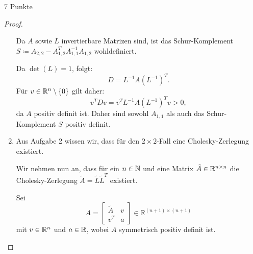 \documentclass{problemset}
\begin{document}
\begin{problem}{7 Punkte}
\begin{proof}
\begin{enumerate}
              Da \( A \) sowie \( L \) invertierbare Matrizen sind, ist das
              Schur-Komplement \( S \coloneq A_{2,2} - A_{1,2}^T A_{1,1}^{-1}
              A_{1,2} \) wohldefiniert.

              Da \(\det(L) = 1\), folgt:
              \[
                  D = L^{-1} A {\left(L^{-1}\right)}^T.
              \]
              Für \(v \in \mathbb{R}^n \setminus \{0\}\) gilt daher:
              \[
                  v^T D v = v^T L^{-1} A {\left(L^{-1}\right)}^T v > 0,
              \]
              da \( A \) positiv definit ist. Daher sind sowohl \( A_{1,1} \)
              als auch das Schur-Komplement \( S \) positiv definit.

        \item Aus Aufgabe 2 wissen wir, dass für den \(2 \times 2\)-Fall eine
              Cholesky-Zerlegung existiert.

              Wir nehmen nun an, dass für ein \( n \in \mathbb{N} \) und eine
              Matrix \( \tilde{A} \in \mathbb{R}^{n \times n} \) die
              Cholesky-Zerlegung \( \tilde{A} = \tilde{L} \tilde{L}^T \)
              existiert.

              Sei
              \begin{equation*}
                  A = \begin{bmatrix}
                      \tilde{A} & v \\
                      v^T       & a
                  \end{bmatrix} \in \mathbb{R}^{(n+1) \times (n+1)}
              \end{equation*}
              mit \( v \in \mathbb{R}^n \) und \( a \in \mathbb{R} \), wobei \(
              A \) symmetrisch positiv definit ist.


\end{enumerate}
\end{proof}
\end{problem}
\end{document}
